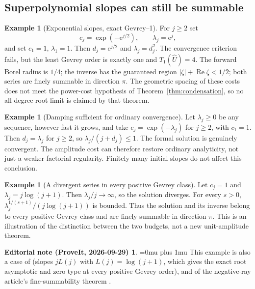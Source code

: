\documentclass[11pt,a4paper]{article}
\numberwithin{equation}{section}
\theoremstyle{definition}
\newtheorem{example}[theorem]{Example}
\theoremstyle{remark}
\theoremstyle{definition}
\newtheorem*{ednoteinner}{Editorial note (ProveIt, 2026-09-29)}
\newenvironment{ednote}{\begin{ednoteinner}\sloppy\Urlmuskip=0mu plus 1mu\relax}{\end{ednoteinner}}
\newcommand{\U}{\widehat U}
\newcommand{\e}{\mathrm e}
\newcommand{\Ree}{\operatorname{Re}}
\begin{document}
\subsection{Superpolynomial slopes can still be summable}
\begin{example}[Exponential slopes, exact Gevrey--1]
For $j\ge2$ set
\[
 c_j=\exp(-\e^{j/2}),\qquad \lambda_j=\e^j,
\]
and set $c_1=1$, $\lambda_1=1$. Then $d_j=\e^{j/2}$ and
$\lambda_j=d_j^2$. The convergence criterion fails, but the least Gevrey
order is exactly one and $T_1(\U)=4$. The forward Borel radius is
$1/4$; the inverse has the guaranteed region
$|\zeta|+\Ree\zeta<1/2$; both series are finely summable in direction
$\pi$. The geometric spacing of these costs does not meet the power-cost
hypothesis of Theorem~\ref{thm:condensation}, so no all-degree root limit
is claimed by that theorem.
\end{example}

\begin{example}[Damping sufficient for ordinary convergence]
Let $\lambda_j\ge0$ be any sequence, however fast it grows, and take
$c_j=\exp(-\lambda_j)$ for $j\ge2$, with $c_1=1$.
Then $d_j=\lambda_j$ for $j\ge2$, so
$\lambda_j/(j+d_j)\le1$. The formal solution is genuinely convergent.
The amplitude cost can therefore restore ordinary analyticity, not just
a weaker factorial regularity. Finitely many initial slopes do not
affect this conclusion.
\end{example}

\begin{example}[A divergent series in every positive Gevrey class]
Let $c_j=1$ and $\lambda_j=j\log(j+1)$. Then
$\lambda_j/j\to\infty$, so the solution diverges. For every $s>0$,
$\lambda_j^{1/(s+1)}/(j\log(j+1))$ is bounded. Thus the solution and
its inverse belong to every positive Gevrey class and are finely
summable in direction $\pi$. This is an illustration of the distinction
between the two budgets, not a new unit-amplitude theorem.
\end{example}
\begin{ednote}
This example is also a case of
 \cite{ed:nlb} (slopes
$jL(j)$ with $L(j)=\log(j+1)$, which gives the exact root asymptotic and
zero type at every positive Gevrey order), and of the negative-ray
article's fine-summability theorem \cite{negative}.
\end{ednote}
\end{document}

